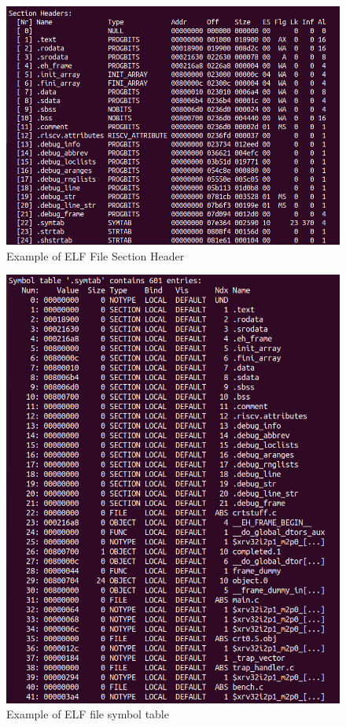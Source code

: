 \begin{figure}
    \centering
    \includegraphics[width=.85\linewidth]{figures/ELF_section_header.png}
    \caption{Example of ELF File Section Header}
    \label{fig:elf_section_headers_example}
\end{figure}

\begin{figure}
    \centering
    \includegraphics[width=.8\linewidth]{figures/ELF_symtab.png}
    \caption{Example of ELF file symbol table}
    \label{fig:elf_symbol_table}
\end{figure}

